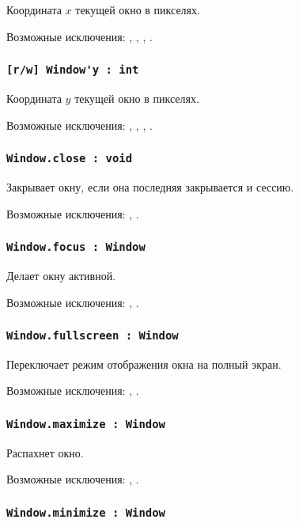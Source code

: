 Координата $x$ текущей окно в пикселях.

Возможные исключения: , , , .

\subsubsection{\lstinline|[r/w] Window'y : int|}

Координата $y$ текущей окно в пикселях.

Возможные исключения: , , , .

\subsubsection{\lstinline|Window.close : void|}

Закрывает окну, если она последняя закрывается и сессию.

Возможные исключения: , .

\subsubsection{\lstinline|Window.focus : Window|}

Делает окну активной.

Возможные исключения: , .

\subsubsection{\lstinline|Window.fullscreen : Window|}

Переключает режим отображения окна на полный экран.

Возможные исключения: , .

\subsubsection{\lstinline|Window.maximize : Window|}

Распахнет окно.

Возможные исключения: , .

\subsubsection{\lstinline|Window.minimize : Window|}

